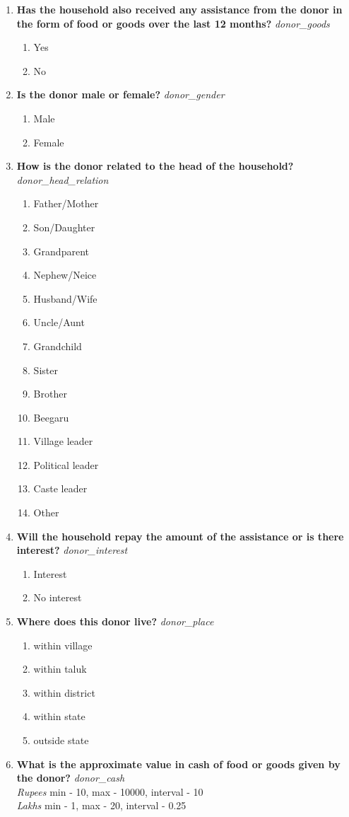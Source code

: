 \documentclass{article}
\begin{document}
\begin{enumerate}
\begin{enumerate}[label*=\arabic*.]
\item {\bfseries Has the household also received any assistance from the donor  in the form of food or goods over the last 12 months?}\emph{ donor\_goods }
\begin{enumerate}
\item Yes
\item No
\end{enumerate}
\item {\bfseries Is the donor male or female?}\emph{ donor\_gender }
\begin{enumerate}
\item Male
\item Female
\end{enumerate}
\item {\bfseries How is the donor related to the head of the household?}\emph{ donor\_head\_relation }
\begin{enumerate}
\item Father/Mother
\item Son/Daughter
\item Grandparent
\item Nephew/Neice
\item Husband/Wife
\item Uncle/Aunt
\item Grandchild
\item Sister
\item Brother
\item Beegaru
\item Village leader
\item Political leader
\item Caste leader
\item Other
\end{enumerate}
\item {\bfseries Will the household repay the amount of the assistance or is there interest?}\emph{ donor\_interest }
\begin{enumerate}
\item Interest
\item No interest
\end{enumerate}
\item {\bfseries Where does this donor live?}\emph{ donor\_place }
\begin{enumerate}
\item within village
\item within taluk
\item within district
\item within state
\item outside state
\end{enumerate}
\item {\bfseries What is the approximate value in cash of food or goods given by the donor?}\emph{ donor\_cash }
\\ \emph{ Rupees }min - 10, max - 10000, interval - 10
\\ \emph{ Lakhs }min - 1, max - 20, interval - 0.25


\end{enumerate}
\end{enumerate}
\end{document}

